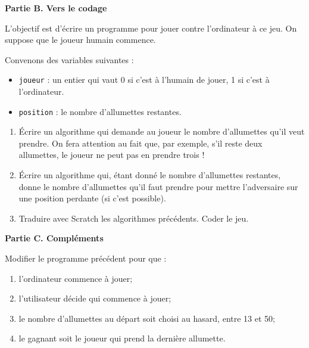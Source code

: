 \vspace{0.4cm}
\textbf{ Partie B. Vers le codage}
 \vspace{0.4cm}

L'objectif est d'écrire un programme pour jouer contre l'ordinateur
à ce jeu. 
On suppose que le joueur humain commence.

Convenons des variables suivantes :
\begin{itemize}
\item \verb!joueur! : un entier qui vaut 0 si c'est à l'humain de jouer,
1 si c'est à l'ordinateur.
\item \verb!position! : le nombre d'allumettes restantes.
\end{itemize}

\begin{enumerate}
\item Écrire un algorithme qui demande au joueur le nombre d'allumettes
qu'il veut prendre. On fera attention au fait que, par exemple, s'il reste
deux allumettes, le joueur ne peut pas en prendre trois !


 
\item Écrire un algorithme qui, étant donné le nombre d'allumettes
restantes, donne le nombre d'allumettes qu'il faut prendre pour mettre
l'adversaire sur une position perdante (si c'est possible).


\item Traduire avec Scratch les algorithmes précédents. Coder le jeu.
\end{enumerate}
 \vspace{0.4cm}
 {\bf Partie C. Compléments }
 \vspace{0.4cm}
 
Modifier le programme précédent pour que :
\begin{enumerate}
\item l'ordinateur commence à jouer;
\item l'utilisateur décide qui commence à jouer;
\item le nombre d'allumettes au départ soit choisi au hasard,
entre 13 et 50;
\item le gagnant soit le joueur qui prend la dernière allumette. 
\end{enumerate}
 

